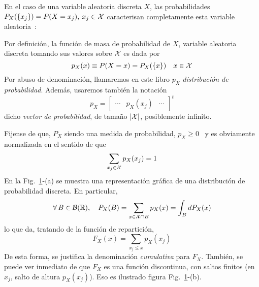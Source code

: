 En el  caso de una variable  aleatoria discreta $X$,  las probabilidades $P_X(\{
x_j \})  = P(X = x_j), \:  x_j \in \mathcal{X}$ caracterisan  completamente esta variable
aleatoria~\cite{AthLah06, HogMck13}:
%
\begin{definicion}
  Por  definici\'on, la  funci\'on  de  masa de  probabilidad  de $X$,  variable
  aleatoria discreta tomando sus valores sobre $\mathcal{X}$ es dada por
  \[
  p_X(x) \equiv P(X = x) = P_X( \{ x\} ) \quad x \in \mathcal{X}
  \]
  Por   abuso  de   denominaci\'on,  llamaremos   en  este   libro   $p_X$  {\it
    distribuci\'on de probabilidad}. Adem\'as, usaremos tambi\'en la notaci\'on
  \[
  p_X = \begin{bmatrix} \cdots & p_X(x_j) & \cdots \end{bmatrix}^t
  \]
  dicho {\it vector de probabilidad}, de tama\~no $|\mathcal{X}|$, posiblemente infinito.
\end{definicion}
%
Fijense de  que, $P_X$ siendo  una medida  de probabilidad, $p_X  \ge 0$ \  y es
obviamente normalizada en el sentido de que
%
\[
\sum_{x_j \in \mathcal{X}} p_X(x_j) = 1
\]
%
En  la  Fig.~\ref{fig:MP:ProbaDiscreta}-(a)   se  muestra  una  representaci\'on
gr\'afica de una distribuci\'on de probabilidad discreta.
%
En particular,
%
\[
\forall \,  B \in  \mathcal{B}(\mathbb{R}), \quad  P_X(B) = \sum_{x  \in \mathcal{X}  \cap B}  p_X(x) =
\int_B dP_X(x)
\]
%
lo que da, tratando de la funci\'on de repartici\'on,
%
\[
F_X(x) = \sum_{x_j \le x} p_X(x_j)
\]
%
De  esta forma,  se justifica  la  denominaci\'on {\it  cumulativa} para  $F_X$.
Tambi\'en, se puede ver inmediato de que $F_X$ es una funci\'on discontinua, con
saltos finitos (en  $x_j$, salto de altura $p_X(x_j)$).  Eso es ilustrado figura
Fig.~\ref{fig:MP:ProbaDiscreta}-(b).

\begin{figure}[h!]
\begin{center}  \end{center}
%
\label{fig:MP:ProbaDiscreta}
\end{figure}

